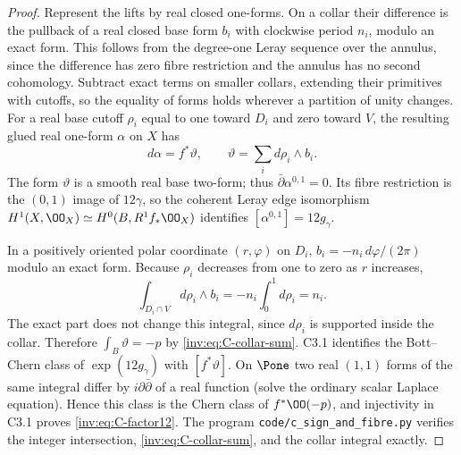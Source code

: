 \begin{proof}
Represent the lifts by real closed one-forms.  On a collar their
difference is the pullback of a real closed base form $b_i$ with
clockwise period $n_i$, modulo an exact form.  This follows from the
degree-one Leray sequence over the annulus, since the difference has
zero fibre restriction and the annulus has no second cohomology.
Subtract exact terms on smaller collars, extending their primitives
with cutoffs, so the equality of forms holds wherever a partition of
unity changes.  For a real base cutoff $\rho_i$ equal to one toward
$D_i$ and zero toward $V$, the resulting glued real one-form $\alpha$
on $X$ has
\[
d\alpha=f^*\vartheta,\qquad
\vartheta=\sum_i d\rho_i\wedge b_i.
\]
The form $\vartheta$ is a smooth real base two-form; thus
$\bar\partial\alpha^{0,1}=0$.  Its fibre restriction is the
$(0,1)$ image of $12\gamma$, so the coherent Leray edge isomorphism
$H^1(X,\OO_X)\simeq H^0(B,R^1f_*\OO_X)$ identifies
$[\alpha^{0,1}]=12g_\gamma$.

In a positively oriented polar coordinate $(r,\varphi)$ on $D_i$,
$b_i=-n_i\,d\varphi/(2\pi)$ modulo an exact form.
Because $\rho_i$ decreases from one to zero as $r$ increases,
\[
\int_{D_i\cap V}d\rho_i\wedge b_i
=-n_i\int_0^1d\rho_i=n_i.
\]
The exact part does not change this integral, since $d\rho_i$ is
supported inside the collar.  Therefore
$\int_B\vartheta=-p$ by \eqref{inv:eq:C-collar-sum}.  C3.1 identifies
the Bott--Chern class of $\exp(12g_\gamma)$ with $[f^*\vartheta]$.
On $\Pone$ two real $(1,1)$ forms of the same integral differ by
$i\partial\bar\partial$ of a real function (solve the ordinary
scalar Laplace equation).  Hence this class is the Chern class of
$f^*\OO(-p)$, and injectivity in C3.1 proves
\eqref{inv:eq:C-factor12}.  The program
\texttt{code/c\_sign\_and\_fibre.py} verifies the integer
intersection, \eqref{inv:eq:C-collar-sum}, and the collar integral exactly.
\end{proof}

